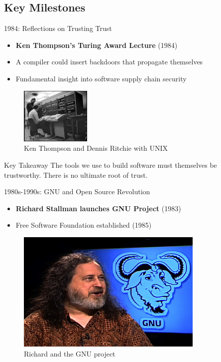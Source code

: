 \documentclass{beamer}
\begin{document}
\subsection{Key Milestones}

\begin{frame}[t]{1984: Reflections on Trusting Trust}
\begin{itemize}
    \item \textbf{Ken Thompson's Turing Award Lecture} (1984)
    \item A compiler could insert backdoors that propagate themselves
    \item Fundamental insight into software supply chain security
\end{itemize}
\begin{figure}
    \includegraphics[width=0.3\textwidth]{images/Ken_UNIX.png}
    \caption{Ken Thompson and Dennis Ritchie with UNIX}
\end{figure}
\pause
\begin{alertblock}{Key Takeaway}
    The tools we use to build software must themselves be trustworthy. There is no ultimate root of trust.
\end{alertblock}
\end{frame}



\begin{frame}[t]{1980s-1990s: GNU and Open Source Revolution}
    \begin{itemize}
        \item \textbf{Richard Stallman launches GNU Project} (1983)
        \item Free Software Foundation established (1985)
    \end{itemize}
    \begin{figure}
        \includegraphics[width=0.8\textwidth]{images/stallman.jpg}
        \caption{Richard and the GNU project}
    \end{figure}
\end{frame}
\end{document}
